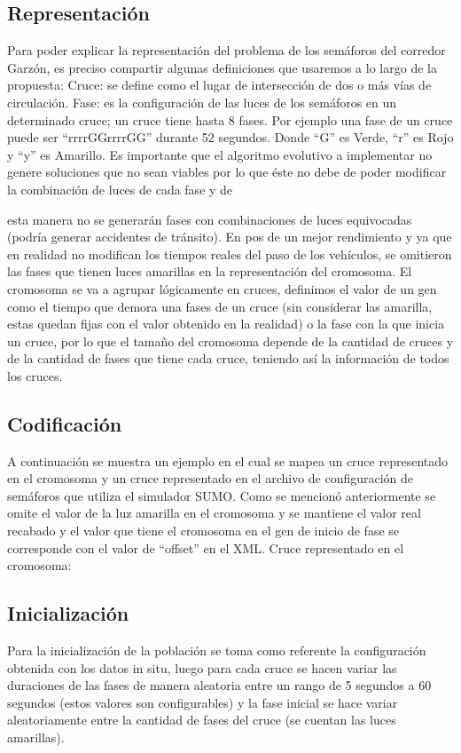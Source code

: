 \subsection{Representación}
Para poder explicar la representación del problema de los
semáforos del corredor Garzón, es preciso compartir algunas
definiciones que usaremos a lo largo de la propuesta:
Cruce: se define como el lugar de intersección de dos o
más vías de circulación.
Fase: es la configuración de las luces de los semáforos
en un determinado cruce; un cruce tiene hasta 8 fases.
Por ejemplo una fase de un cruce puede ser
“rrrrGGrrrrGG” durante 52 segundos. Donde “G” es
Verde, “r” es Rojo y “y” es Amarillo.  
Es  importante  que  el  algoritmo  evolutivo  a  implementar  no
genere soluciones que no sean viables por lo que éste no debe
de poder modificar la combinación de luces de cada fase y de

esta manera no se generarán fases con combinaciones de luces
equivocadas (podría generar accidentes de tránsito).
En  pos  de  un  mejor  rendimiento  y  ya  que  en  realidad  no
modifican  los  tiempos  reales  del  paso  de  los  vehículos,  se
omitieron  las   fases  que  tienen  luces  amarillas  en  la
representación del cromosoma.
El  cromosoma  se  va  a  agrupar  lógicamente  en  cruces,
definimos el valor de un gen como el tiempo que demora una
fases  de  un  cruce  (sin  considerar  las  amarilla,  estas  quedan
fijas con el valor obtenido en la realidad) o la fase con la que
inicia un cruce, por lo que el tamaño del cromosoma depende
de  la  cantidad  de  cruces  y  de  la  cantidad  de  fases  que  tiene
cada cruce, teniendo así la información de todos los cruces.

\subsection{Codificación} 
A continuación se muestra un ejemplo en el cual se mapea un
cruce representado en el cromosoma y un cruce representado
en  el  archivo  de  configuración  de  semáforos  que  utiliza  el
simulador SUMO.
Como se  mencionó anteriormente se omite el valor de la luz
amarilla en el cromosoma y se mantiene el valor real recabado
y el valor que tiene el cromosoma en el gen de inicio de fase
se corresponde con el valor de “offset” en el XML.
Cruce representado en el cromosoma:

\subsection{Inicialización}
Para la inicialización de la población se toma como referente
la configuración obtenida con los datos in situ, luego para cada
cruce  se  hacen  variar  las  duraciones  de  las  fases  de  manera
aleatoria  entre  un  rango  de  5  segundos  a  60  segundos  (estos
valores  son  configurables)  y  la  fase  inicial  se  hace  variar
aleatoriamente entre la cantidad de fases del cruce  (se cuentan
las luces amarillas).

